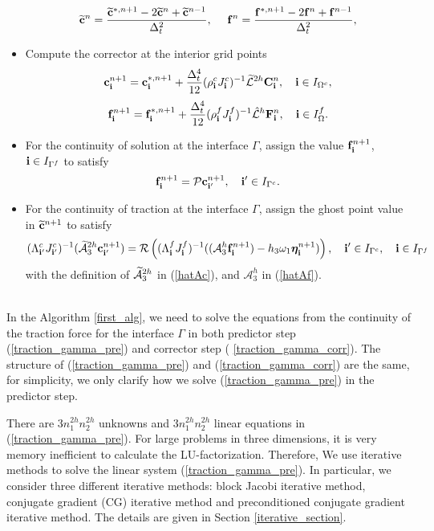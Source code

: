 \begin{breakablealgorithm}
\begin{itemize}
{			\begin{equation*}
			\widetilde{\bf c}^n= \frac{\widetilde{\bf c}^{*,n+1}-2\widetilde{\bf c}^{n}+\widetilde{\bf c}^{n-1}}{\Delta^2_t},\ \ \ \
			{\bf f}^{n} = \frac{{\bf f}^{*,n+1}-2{\bf f}^{n}+{\bf f}^{n-1}}{\Delta^2_t},
			\end{equation*}
		}
		\item{Compute the corrector at the interior grid points
			\[{\bf c}^{n+1}_{\bf i} = {\bf c}^{*,n+1}_{\bf i} + \frac{\Delta_t^4}{12}(\rho^{c}_{\bf i}J^c_{\bf i})^{-1}\widetilde{\mathcal{L}}^{2h}{\bf{C}}^{n}_{\bf i},\quad {\bf i}\in I_{\Omega^c},\]
			\[{\bf f}^{n+1}_{\bf i} = {\bf f}^{*,n+1}_{\bf i} + \frac{\Delta_t^4}{12}(\rho^{f}_{\bf i}J^f_{\bf i})^{-1}\hat{\mathcal{L}}^{h}{\bf{F}}^{n}_{\bf i},\quad {\bf i}\in I_\Omega^f.\]
		}
		\item{For the continuity of solution at the interface $\Gamma$, assign the value ${\bf f}^{n+1}_{\bf i}$, ${\bf i}\in I_{\Gamma^f}$ to satisfy
			\begin{equation*}
			{\bf f}^{n+1}_{\bf i} = {\mathcal{P}}{\bf c}^{n+1}_{{\bf i}'}, \quad {{\bf i}'}\in I_{\Gamma^c}.
			\end{equation*}
		}
		\item{For the continuity of traction at the interface $\Gamma$, assign the ghost point value in $\widetilde{\bf c}^{n+1}$ to satisfy
			\begin{equation}\label{traction_gamma_corr}
			({\Lambda}^{c}_{{\bf i}'}{J}_{{\bf i}'}^{c})^{-1}(\wt{\mathcal{A}}_3^{2h}{\bf c}^{n+1}_{{\bf i}'})
			= {\mathcal{R}}\left(({\Lambda}^{f}_{\bf i}{ J}^f_{\bf i})^{-1}((\mathcal{A}_3^h{\bf f}^{n+1}_{\bf i})-h_3\omega_1{\bm \eta}^{n+1}_{\bf i})\right), \quad {{\bf i}'}\in I_{\Gamma^c}, \quad {\bf i}\in I_{\Gamma^f}
			\end{equation}
			with the definition of $\widetilde{\mathcal{A}}_3^{2h}$ in (\ref{hatAc}), and $\mathcal{A}_3^h$ in (\ref{hatAf}).
		}
	\end{itemize}
\end{breakablealgorithm}
~\\

In the Algorithm \ref{first_alg}, we need to solve the equations from the continuity of the traction force for the interface $\Gamma$ in both predictor step (\ref{traction_gamma_pre}) and corrector step (
\ref{traction_gamma_corr}). The structure of (\ref{traction_gamma_pre}) and (\ref{traction_gamma_corr}) are the same, for simplicity, we only clarify how we solve (\ref{traction_gamma_pre}) in the predictor step.

There are $3n_1^{2h}n_2^{2h}$ unknowns and $3n_1^{2h}n_2^{2h}$ linear equations in (\ref{traction_gamma_pre}). For large problems in three dimensions, it is very memory inefficient to calculate the LU-factorization. Therefore, We use iterative methods to solve the linear system (\ref{traction_gamma_pre}). In particular, we consider three different iterative methods: block Jacobi iterative method, conjugate gradient (CG) iterative method and preconditioned conjugate gradient iterative method. The details are given in Section \ref{iterative_section}.